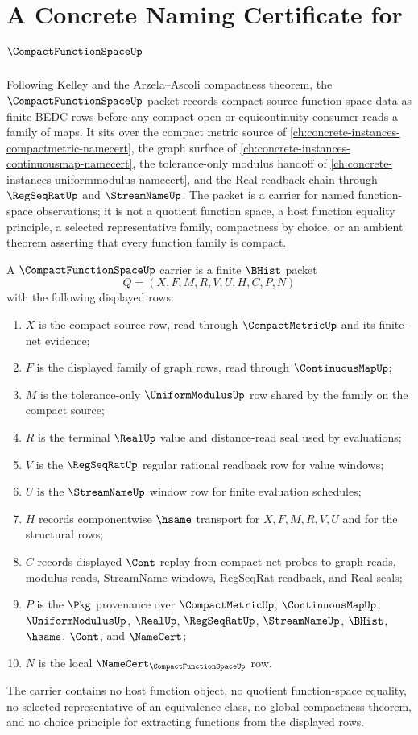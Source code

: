 \chapter{A Concrete Naming Certificate for $\CompactFunctionSpaceUp$}
\label{ch:concrete-instances-compact-function-space-namecert}

Following Kelley and the Arzela--Ascoli compactness theorem, the $\CompactFunctionSpaceUp$ packet records compact-source function-space data as finite BEDC rows before any compact-open or equicontinuity consumer reads a family of maps. It sits over the compact metric source of \autoref{ch:concrete-instances-compactmetric-namecert}, the graph surface of \autoref{ch:concrete-instances-continuousmap-namecert}, the tolerance-only modulus handoff of \autoref{ch:concrete-instances-uniformmodulus-namecert}, and the Real readback chain through $\RegSeqRatUp$ and $\StreamNameUp$. The packet is a carrier for named function-space observations; it is not a quotient function space, a host function equality principle, a selected representative family, compactness by choice, or an ambient theorem asserting that every function family is compact.

\begin{definition}
\label{def:compact-function-space-carrier}
A $\CompactFunctionSpaceUp$ carrier is a finite $\BHist$ packet
$$
Q=(X,F,M,R,V,U,H,C,P,N)
$$
with the following displayed rows:
\begin{enumerate}
\item $X$ is the compact source row, read through $\CompactMetricUp$ and its finite-net evidence;
\item $F$ is the displayed family of graph rows, read through $\ContinuousMapUp$;
\item $M$ is the tolerance-only $\UniformModulusUp$ row shared by the family on the compact source;
\item $R$ is the terminal $\RealUp$ value and distance-read seal used by evaluations;
\item $V$ is the $\RegSeqRatUp$ regular rational readback row for value windows;
\item $U$ is the $\StreamNameUp$ window row for finite evaluation schedules;
\item $H$ records componentwise $\hsame$ transport for $X,F,M,R,V,U$ and for the structural rows;
\item $C$ records displayed $\Cont$ replay from compact-net probes to graph reads, modulus reads, StreamName windows, RegSeqRat readback, and Real seals;
\item $P$ is the $\Pkg$ provenance over $\CompactMetricUp$, $\ContinuousMapUp$, $\UniformModulusUp$, $\RealUp$, $\RegSeqRatUp$, $\StreamNameUp$, $\BHist$, $\hsame$, $\Cont$, and $\NameCert$;
\item $N$ is the local $\NameCert_{\CompactFunctionSpaceUp}$ row.
\end{enumerate}
The carrier contains no host function object, no quotient function-space equality, no selected representative of an equivalence class, no global compactness theorem, and no choice principle for extracting functions from the displayed rows.
\end{definition}


